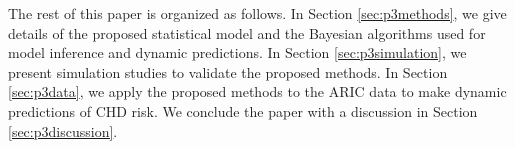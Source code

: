 





The rest of this paper is organized as follows. In Section \ref{sec:p3methods}, we give details of the proposed statistical model and the Bayesian algorithms used for model inference and dynamic predictions. In Section \ref{sec:p3simulation}, we present simulation studies to validate the proposed methods. In Section \ref{sec:p3data}, we apply the proposed methods to the ARIC data to make dynamic predictions of CHD risk. We conclude the paper with a discussion in Section \ref{sec:p3discussion}.
% 
% 

